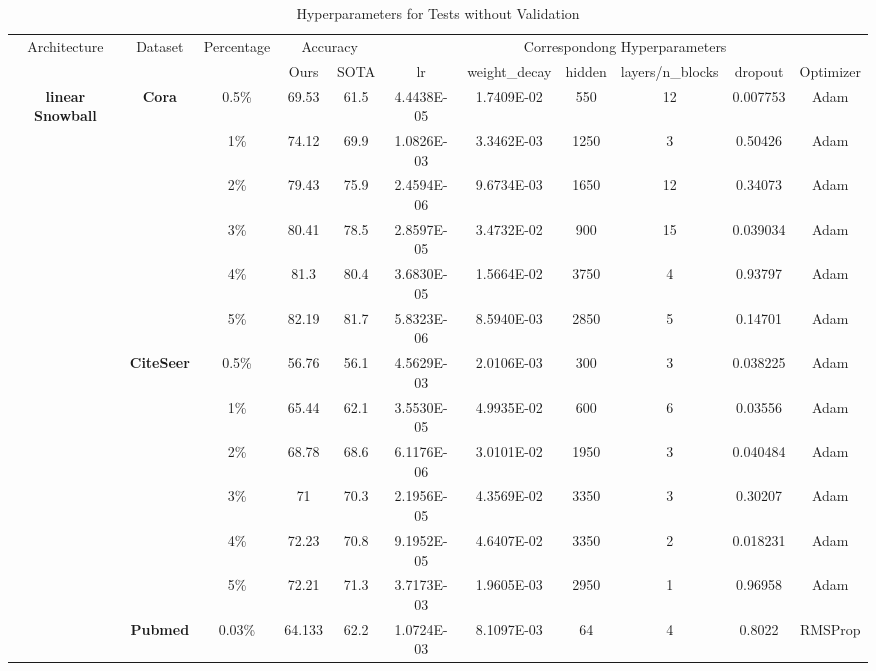 \begin{table}[htbp]
\setlength{\tabcolsep}{1.5pt}
  \centering
  \caption{Hyperparameters for Tests without Validation}
  \scriptsize
    \begin{tabular}{ccccc|cccccc}
    \toprule
    \toprule
    \multirow{2}[2]{*}{Architecture} & \multirow{2}[2]{*}{Dataset} & \multirow{2}[2]{*}{Percentage} & \multicolumn{2}{c|}{Accuracy} & \multicolumn{6}{c}{Correspondong Hyperparameters} \\
          &       &       & Ours  & SOTA  & lr    & weight\_decay & hidden & layers/n\_blocks & dropout & Optimizer \\
    \midrule
    \multirow{16}[2]{*}{\textbf{linear Snowball}} & \multirow{6}[1]{*}{\textbf{Cora}} & 0.5\% & 69.53 & 61.5  & 4.4438E-05 & 1.7409E-02 & 550   & 12    & 0.007753 & Adam \\
          &       & 1\%   & 74.12 & 69.9  & 1.0826E-03 & 3.3462E-03 & 1250  & 3     & 0.50426 & Adam \\
          &       & 2\%   & 79.43 & 75.9  & 2.4594E-06 & 9.6734E-03 & 1650  & 12    & 0.34073 & Adam \\
          &       & 3\%   & 80.41 & 78.5  & 2.8597E-05 & 3.4732E-02 & 900   & 15    & 0.039034 & Adam \\
          &       & 4\%   & 81.3  & 80.4  & 3.6830E-05 & 1.5664E-02 & 3750  & 4     & 0.93797 & Adam \\
          &       & 5\%   & 82.19 & 81.7  & 5.8323E-06 & 8.5940E-03 & 2850  & 5     & 0.14701 & Adam \\
          & \multirow{6}[0]{*}{\textbf{CiteSeer}} & 0.5\% & 56.76 & 56.1  & 4.5629E-03 & 2.0106E-03 & 300   & 3     & 0.038225 & Adam \\
          &       & 1\%   & 65.44 & 62.1  & 3.5530E-05 & 4.9935E-02 & 600   & 6     & 0.03556 & Adam \\
          &       & 2\%   & 68.78 & 68.6  & 6.1176E-06 & 3.0101E-02 & 1950  & 3     & 0.040484 & Adam \\
          &       & 3\%   & 71    & 70.3  & 2.1956E-05 & 4.3569E-02 & 3350  & 3     & 0.30207 & Adam \\
          &       & 4\%   & 72.23 & 70.8  & 9.1952E-05 & 4.6407E-02 & 3350  & 2     & 0.018231 & Adam \\
          &       & 5\%   & 72.21 & 71.3  & 3.7173E-03 & 1.9605E-03 & 2950  & 1     & 0.96958 & Adam \\
          & \multirow{4}[1]{*}{\textbf{Pubmed}} & 0.03\% & 64.133 & 62.2  & 1.0724E-03 & 8.1097E-03 & 64    & 4     & 0.8022 & RMSProp \\

\end{tabular}
\end{table}
